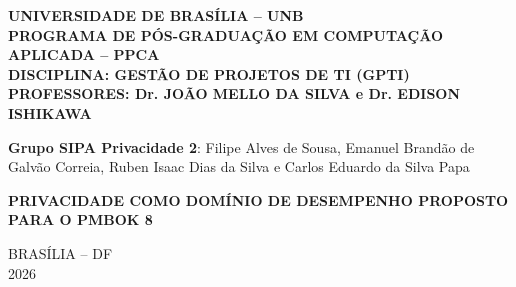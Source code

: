 \documentclass[12pt,a4paper,article,oneside,english,brazil]{abntex2}
\newcommand{\integrantes}{Filipe Alves de Sousa, Emanuel Brandão de Galvão Correia, Ruben Isaac Dias da Silva e Carlos Eduardo da Silva Papa}
\newif\ifavisocapa   \avisocapafalse    %
\begin{document}
\thispagestyle{empty}
\noindent\begin{minipage}[t][0.92\textheight]{\textwidth}
\centering
\SingleSpacing
\textbf{UNIVERSIDADE DE BRASÍLIA -- UNB\\PROGRAMA DE PÓS-GRADUAÇÃO EM COMPUTAÇÃO APLICADA -- PPCA\\DISCIPLINA: GESTÃO DE PROJETOS DE TI (GPTI)\\PROFESSORES: Dr. JOÃO MELLO DA SILVA e Dr. EDISON ISHIKAWA}

\vspace{1cm}

\textbf{Grupo SIPA Privacidade 2}: \integrantes

\vspace{3cm}

\textbf{PRIVACIDADE COMO DOMÍNIO DE DESEMPENHO PROPOSTO PARA O PMBOK 8}

\vspace{1.2cm}
\ifavisocapa
\begin{center}\fbox{\parbox{\dimexpr\linewidth-2\fboxsep-2\fboxrule\relax}{\SingleSpacing\small\noindent\textbf{Declaração de uso de inteligência artificial.} Foi utilizada IA generativa (ChatGPT Astral 6 Sol e Sonnet 5.5, ambos no modo alto) como apoio à revisão de texto, à formatação, à criação de figuras e à formulação de tabelas. A IA não é autora: o grupo é responsável pelo conteúdo, conforme a posição do COPE sobre autoria e ferramentas de IA (COPE, 2023).\par\smallskip\noindent COMMITTEE ON PUBLICATION ETHICS (COPE). \textit{Authorship and AI tools: COPE position statement}. 13 fev. 2023. Disponível em: \url{https://publicationethics.org/guidance/cope-position/authorship-and-ai-tools}.}}\end{center}
\fi
\vfill

BRASÍLIA -- DF\\2026
\end{minipage}
\clearpage
\end{document}
